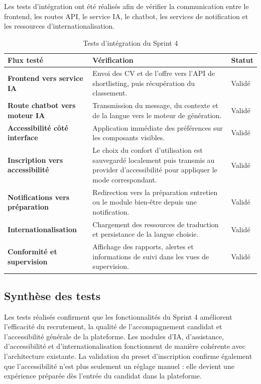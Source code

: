 \documentclass[12pt,a4paper]{report}
\newcommand{\tblhead}[1]{\cellcolor{darkblue}\color{white}\bfseries #1}
\newcommand{\tblleft}[1]{\bfseries\color{darkblue} #1}
\begin{document}
Les tests d'intégration ont été réalisés afin de vérifier la communication entre le frontend, les routes API, le service IA, le chatbot, les services de notification et les ressources d'internationalisation.

\renewcommand{\arraystretch}{1.25}
\begin{table}[H]
\centering
\begin{tabularx}{\textwidth}{|L{4cm}|Y|L{2.3cm}|}
\hline
\tblhead{Flux testé} & \tblhead{Vérification} & \tblhead{Statut} \\
\hline
\tblleft{Frontend vers service IA} & Envoi des CV et de l'offre vers l'API de shortlisting, puis récupération du classement. & Validé \\
\hline
\tblleft{Route chatbot vers moteur IA} & Transmission du message, du contexte et de la langue vers le moteur de génération. & Validé \\
\hline
\tblleft{Accessibilité côté interface} & Application immédiate des préférences sur les composants visibles. & Validé \\
\hline
\tblleft{Inscription vers accessibilité} & Le choix du confort d'utilisation est sauvegardé localement puis transmis au provider d'accessibilité pour appliquer le mode correspondant. & Validé \\
\hline
\tblleft{Notifications vers préparation} & Redirection vers la préparation entretien ou le module bien-être depuis une notification. & Validé \\
\hline
\tblleft{Internationalisation} & Chargement des ressources de traduction et persistance de la langue choisie. & Validé \\
\hline
\tblleft{Conformité et supervision} & Affichage des rapports, alertes et informations de suivi dans les vues de supervision. & Validé \\
\hline
\end{tabularx}
\caption{Tests d'intégration du Sprint 4}
\label{tab:tests-integration-sprint4}
\end{table}
\renewcommand{\arraystretch}{1}

\subsection{Synthèse des tests}

\begin{infobox}
Les tests réalisés confirment que les fonctionnalités du Sprint 4 améliorent l'efficacité du recrutement, la qualité de l'accompagnement candidat et l'accessibilité générale de la plateforme. Les modules d'IA, d'assistance, d'accessibilité et d'internationalisation fonctionnent de manière cohérente avec l'architecture existante. La validation du preset d'inscription confirme également que l'accessibilité n'est plus seulement un réglage manuel : elle devient une expérience préparée dès l'entrée du candidat dans la plateforme.
\end{infobox}
\end{document}
